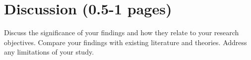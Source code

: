 \chapter{Discussion (0.5-1 pages)}
\label{ch:discussion}
Discuss the significance of your findings and how they relate to your research objectives.
Compare your findings with existing literature and theories. Address any limitations of your study.